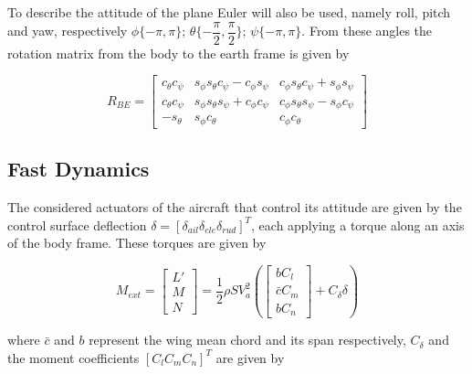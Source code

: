 To describe the attitude of the plane Euler will also be used, namely roll, pitch and yaw, respectively $\phi\{-\pi,\pi\}$; $\theta \{-\dfrac{\pi}{2},\dfrac{\pi}{2}\}$; $\psi \{-\pi,\pi\}$. From these angles the rotation matrix from the body to the earth frame is given by

\begin{equation}
R_{BE}=
\begin{bmatrix}
c_\theta c_\psi & s_\phi s_\theta c_\psi - c_\phi s_\psi & c_\phi s_\theta c_\psi + s_\phi s_\psi \\
c_\theta c_\psi & s_\phi s_\theta s_\psi + c_\phi c_\psi & c_\phi s_\theta s_\psi - s_\phi c_\psi \\
-s_\theta & s_\phi c_\theta & c_\phi c_\theta
\end{bmatrix}
\label{eq:body2earth}
\end{equation}

\subsection{Fast Dynamics}

The considered actuators of the aircraft that control its attitude are given by the control surface deflection $\delta = [\delta_{ail} \delta_{ele} \delta_{rud}]^T$, each applying a torque along an axis of the body frame. These torques are given by

\begin{equation}
M_{ext}=
\begin{bmatrix}
L'\\
M\\
N
\end{bmatrix}
= \dfrac{1}{2}\rho S V_a^2\left(
\begin{bmatrix}
bC_l\\
\bar{c}C_m\\
bC_n
\end{bmatrix}
+ C_\delta \delta\right)
\label{eq:torque}
\end{equation}

where $\bar{c}$ and $b$ represent the wing mean chord and its span respectively, $C_\delta$ and the moment coefficients $[C_l C_m C_n]^T$ are given by

